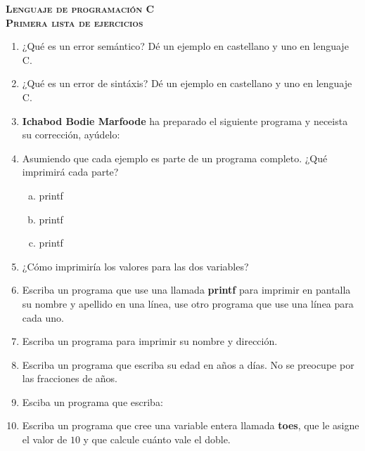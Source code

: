 \documentclass[a4paper,12pt]{report}
\begin{document}
\begin{center}
\scshape\bfseries\large
	Lenguaje de programación C\\
	Primera lista de ejercicios
\end{center}
	\begin{enumerate}[1.]
		\item ¿Qué es un error semántico? Dé un ejemplo en castellano y uno en lenguaje C.
		\item ¿Qué es un error de sintáxis? Dé un ejemplo en castellano y uno en lenguaje C.
		\item \textbf{Ichabod Bodie Marfoode} ha preparado el siguiente programa y neceista su corrección, ayúdelo:
		\item Asumiendo que cada ejemplo es parte de un programa completo. ¿Qué imprimirá cada parte?
		\begin{enumerate}[a)]
			\item printf
			\item printf
			\item printf
		\end{enumerate}
		\item ¿Cómo imprimiría los valores para las dos variables?
		\item Escriba un programa que use una llamada \textbf{printf} para imprimir en pantalla su nombre y apellido en una línea, use otro programa que use una línea para cada uno.
		\item Escriba un programa para imprimir su nombre y dirección.
		\item Escriba un programa que escriba su edad en años a días. No se preocupe por las fracciones de años.
		\item Esciba un programa que escriba:
		\item Escriba un programa que cree una variable entera llamada \textbf{toes}, que le asigne el valor de $10$ y que calcule cuánto vale el doble.
	\end{enumerate}
\end{document}
